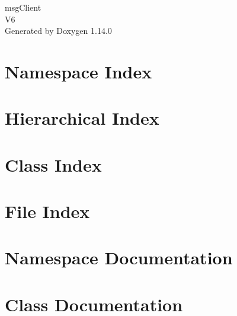 \documentclass[twoside]{book}
\newcommand{\+}{\discretionary{\mbox{\scriptsize$\hookleftarrow$}}{}{}}
\newcommand{\clearemptydoublepage}{%
    \newpage{\pagestyle{empty}\cleardoublepage}%
  }
\begin{document}
  \raggedbottom
    \hypersetup{pageanchor=false,
                bookmarksnumbered=true,
                pdfencoding=unicode
               }
  \begin{titlepage}
  \vspace*{7cm}
  \begin{center}%
  {\Large msg\+Client}\\
  [1ex]\large V6 \\
  \vspace*{1cm}
  {\large Generated by Doxygen 1.14.0}\\
  \end{center}
  \end{titlepage}
  \clearemptydoublepage
  \tableofcontents
  \clearemptydoublepage
  \hypersetup{pageanchor=true}


\chapter{Namespace Index}

\chapter{Hierarchical Index}

\chapter{Class Index}

\chapter{File Index}

\chapter{Namespace Documentation}

\chapter{Class Documentation}














\end{document}
